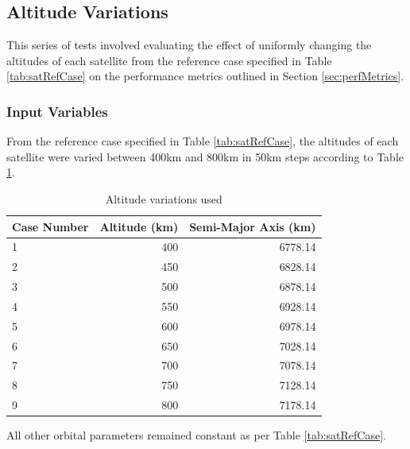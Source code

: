 \newpage
\subsection{Altitude Variations}
This series of tests involved evaluating the effect of uniformly changing the altitudes of each satellite from the reference case specified in Table \ref{tab:satRefCase} on the performance metrics outlined in Section \ref{sec:perfMetrics}.
\subsubsection{Input Variables}
From the reference case specified in Table \ref{tab:satRefCase}, the altitudes of each satellite were varied between 400km and 800km in 50km steps according to Table \ref{tab:altitudeParams}.

\begin{table}[H]
  \centering
  \caption{Altitude variations used}
    \begin{tabular}{p{2.5cm}rr}
    \toprule
    Case Number & Altitude (km) & Semi-Major Axis (km)\\
    \midrule
    1     & 400   & 6778.14 \\
    2     & 450   & 6828.14 \\
    3     & 500   & 6878.14 \\
    4     & 550   & 6928.14 \\
    5     & 600   & 6978.14 \\
    6     & 650   & 7028.14 \\
    7     & 700   & 7078.14 \\
    8     & 750   & 7128.14 \\
    9     & 800   & 7178.14 \\

    \bottomrule
    \end{tabular}%
  \label{tab:altitudeParams}%
\end{table}%
All other orbital parameters remained constant as per Table \ref{tab:satRefCase}.

